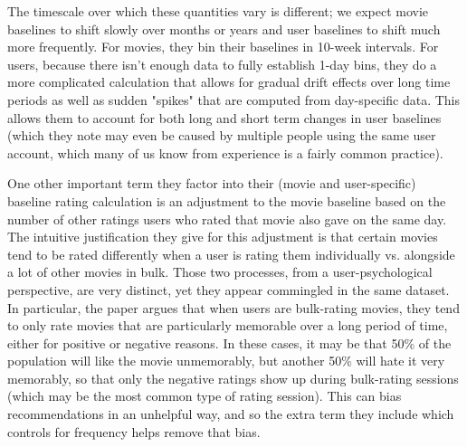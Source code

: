 \documentclass[11pt]{article}
\begin{document}


The timescale over which these quantities vary is different; we expect movie baselines to shift slowly over months or years and user baselines to shift much more frequently. For movies, they bin their baselines in 10-week intervals. For users, because there isn't enough data to fully establish 1-day bins, they do a more complicated calculation that allows for gradual drift effects over long time periods as well as sudden "spikes" that are computed from day-specific data. This allows them to account for both long and short term changes in user baselines (which they note may even be caused by multiple people using the same user account, which many of us know from experience is a fairly common practice).

One other important term they factor into their (movie and user-specific) baseline rating calculation is an adjustment to the movie baseline based on the number of other ratings users who rated that movie also gave on the same day. The intuitive justification they give for this adjustment is that certain movies tend to be rated differently when a user is rating them individually vs. alongside a lot of other movies in bulk. Those two processes, from a user-psychological perspective, are very distinct, yet they appear commingled in the same dataset. In particular, the paper argues that when users are bulk-rating movies, they tend to only rate movies that are particularly memorable over a long period of time, either for positive or negative reasons. In these cases, it may be that 50\% of the population will like the movie unmemorably, but another 50\% will hate it very memorably, so that only the negative ratings show up during bulk-rating sessions (which may be the most common type of rating session). This can bias recommendations in an unhelpful way, and so the extra term they include which controls for frequency helps remove that bias.
\end{document}
